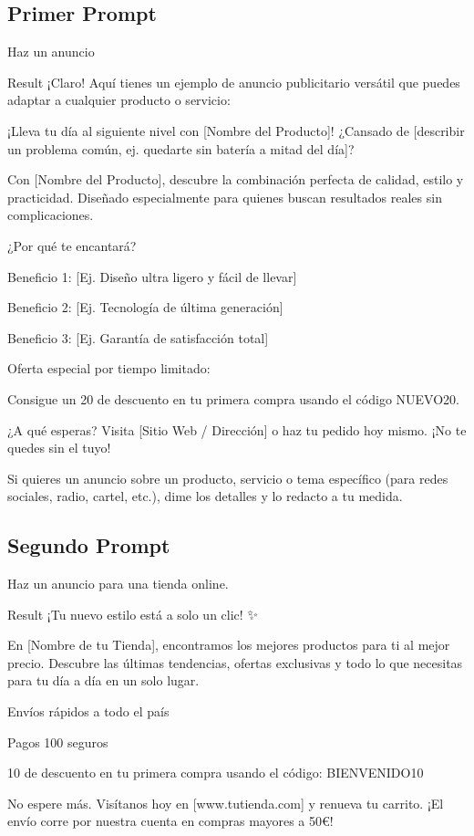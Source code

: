 \documentclass[12pt,a4paper]{article}
\begin{document}
\subsection{Primer Prompt}
\begin{AgenticPromptbox}
    Haz un anuncio
\end{AgenticPromptbox}

\begin{result}{Result}
    ¡Claro! Aquí tienes un ejemplo de anuncio publicitario versátil que puedes adaptar a cualquier producto o servicio:

¡Lleva tu día al siguiente nivel con [Nombre del Producto]!
¿Cansado de [describir un problema común, ej. quedarte sin batería a mitad del día]?

Con [Nombre del Producto], descubre la combinación perfecta de calidad, estilo y practicidad. Diseñado especialmente para quienes buscan resultados reales sin complicaciones.

¿Por qué te encantará?

Beneficio 1: [Ej. Diseño ultra ligero y fácil de llevar]

Beneficio 2: [Ej. Tecnología de última generación]

Beneficio 3: [Ej. Garantía de satisfacción total]

Oferta especial por tiempo limitado:

Consigue un 20 de descuento en tu primera compra usando el código NUEVO20.

¿A qué esperas? Visita [Sitio Web / Dirección] o haz tu pedido hoy mismo. ¡No te quedes sin el tuyo!

Si quieres un anuncio sobre un producto, servicio o tema específico (para redes sociales, radio, cartel, etc.), dime los detalles y lo redacto a tu medida.
\end{result}

\subsection{Segundo Prompt}
\begin{AgenticPromptbox}
    Haz un anuncio para una tienda online.
\end{AgenticPromptbox}

\begin{result}{Result}
    ¡Tu nuevo estilo está a solo un clic! ✨

En [Nombre de tu Tienda], encontramos los mejores productos para ti al mejor precio. Descubre las últimas tendencias, ofertas exclusivas y todo lo que necesitas para tu día a día en un solo lugar.

Envíos rápidos a todo el país

Pagos 100 seguros

10 de descuento en tu primera compra usando el código: BIENVENIDO10

No espere más. Visítanos hoy en [www.tutienda.com] y renueva tu carrito. ¡El envío corre por nuestra cuenta en compras mayores a 50€!
\end{result}
\end{document}
